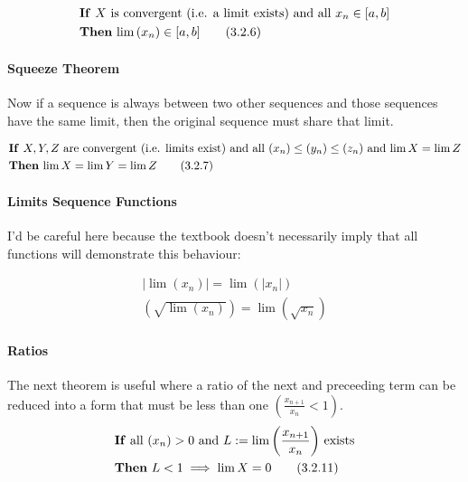 \documentclass[class=article, crop=false]{standalone}
\begin{document}
\begin{align}
  &\text{\textbf{If} $X$ is convergent (i.e. a limit exists) and all $x_n \in \left[ a,b \right]$}  \notag \\
  &\text{\textbf{Then} $\lim\left( x_{n} \right) \in \left[ a,b \right]$} \tag{3.2.6}
  \label{326}
\end{align}

\paragraph{Squeeze Theorem} Now if a sequence is always between two other sequences and those sequences have the same limit, then the original sequence must share that limit. 


\begin{align}
  &\text{\textbf{If} $X, Y, Z$ are convergent (i.e. limits exist) and all $\left( x_n \right) \leq \left( y_n \right) \leq \left( z_n \right)$ and $\lim X = \lim Z$} \notag \\
  &\text{\textbf{Then} $\lim X = \lim Y = \lim Z$} \tag{3.2.7}
  \label{327}
\end{align}

\paragraph{Limits Sequence Functions} I'd be careful here because the textbook doesn't necessarily imply that all functions will demonstrate this behaviour:

\begin{align}
  \lvert \lim (x_n) \rvert = \lim \left( \lvert x_n \rvert \right) \tag{3.2.9}
  \label{329} \\
  \left( \sqrt{\lim \left( x_n \right)} \right) = \lim \left( \sqrt{x_n} \right) \tag{3.2.10} \label{3210}
\end{align}

\paragraph{Ratios}

The next theorem is useful where a ratio of the next and preceeding term can be reduced into a form that must be less than one $\left( \frac{x_{n+1}}{x_n} < 1 \right)$.\\


\begin{align}
&  \text{\textbf{If} all $(x_n) > 0$ and $L := \lim \left( \frac{x_{n+1}}{x_n} \right)$ exists} \notag \\
& \text{\textbf{Then} $L<1 \implies \lim X = 0$} \tag{3.2.11} \label{3211}
\end{align}
\end{document}
